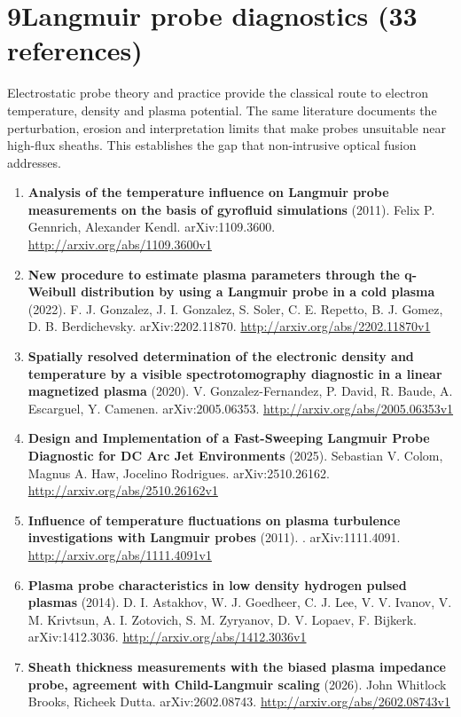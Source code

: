 \documentclass[11pt,a4paper]{article}
\begin{document}
\section*{9\quad Langmuir probe diagnostics \textnormal{(\normalsize 33 references)}}
Electrostatic probe theory and practice provide the classical route to electron temperature, density and plasma potential. The same literature documents the perturbation, erosion and interpretation limits that make probes unsuitable near high-flux sheaths. This establishes the gap that non-intrusive optical fusion addresses.
\begin{enumerate}[leftmargin=1.4em]
\item \textbf{Analysis of the temperature influence on Langmuir probe measurements on the basis of gyrofluid simulations} (2011). Felix P. Gennrich, Alexander Kendl. arXiv:1109.3600. \url{http://arxiv.org/abs/1109.3600v1}
\item \textbf{New procedure to estimate plasma parameters through the q-Weibull distribution by using a Langmuir probe in a cold plasma} (2022). F. J. Gonzalez, J. I. Gonzalez, S. Soler, C. E. Repetto, B. J. Gomez, D. B. Berdichevsky. arXiv:2202.11870. \url{http://arxiv.org/abs/2202.11870v1}
\item \textbf{Spatially resolved determination of the electronic density and temperature by a visible spectrotomography diagnostic in a linear magnetized plasma} (2020). V. Gonzalez-Fernandez, P. David, R. Baude, A. Escarguel, Y. Camenen. arXiv:2005.06353. \url{http://arxiv.org/abs/2005.06353v1}
\item \textbf{Design and Implementation of a Fast-Sweeping Langmuir Probe Diagnostic for DC Arc Jet Environments} (2025). Sebastian V. Colom, Magnus A. Haw, Jocelino Rodrigues. arXiv:2510.26162. \url{http://arxiv.org/abs/2510.26162v1}
\item \textbf{Influence of temperature fluctuations on plasma turbulence investigations with Langmuir probes} (2011). . arXiv:1111.4091. \url{http://arxiv.org/abs/1111.4091v1}
\item \textbf{Plasma probe characteristics in low density hydrogen pulsed plasmas} (2014). D. I. Astakhov, W. J. Goedheer, C. J. Lee, V. V. Ivanov, V. M. Krivtsun, A. I. Zotovich, S. M. Zyryanov, D. V. Lopaev, F. Bijkerk. arXiv:1412.3036. \url{http://arxiv.org/abs/1412.3036v1}
\item \textbf{Sheath thickness measurements with the biased plasma impedance probe, agreement with Child-Langmuir scaling} (2026). John Whitlock Brooks, Richeek Dutta. arXiv:2602.08743. \url{http://arxiv.org/abs/2602.08743v1}

\end{enumerate}
\end{document}
